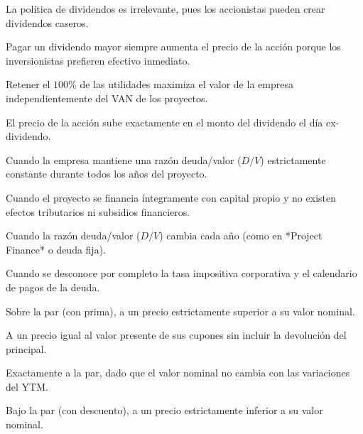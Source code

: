 \begin{opts}
    \item La política de dividendos es irrelevante, pues los accionistas pueden crear dividendos caseros.
    \item Pagar un dividendo mayor siempre aumenta el precio de la acción porque los inversionistas prefieren efectivo inmediato.
    \item Retener el $100\%$ de las utilidades maximiza el valor de la empresa independientemente del VAN de los proyectos.
    \item El precio de la acción sube exactamente en el monto del dividendo el día ex-dividendo.
\end{opts}

\begin{opts}
    \item Cuando la empresa mantiene una razón deuda/valor ($D/V$) estrictamente constante durante todos los años del proyecto.
    \item Cuando el proyecto se financia íntegramente con capital propio y no existen efectos tributarios ni subsidios financieros.
    \item Cuando la razón deuda/valor ($D/V$) cambia cada año (como en *Project Finance* o deuda fija).
    \item Cuando se desconoce por completo la tasa impositiva corporativa y el calendario de pagos de la deuda.
\end{opts}

\begin{opts}
    \item Sobre la par (con prima), a un precio estrictamente superior a su valor nominal.
    \item A un precio igual al valor presente de sus cupones sin incluir la devolución del principal.
    \item Exactamente a la par, dado que el valor nominal no cambia con las variaciones del YTM.
    \item Bajo la par (con descuento), a un precio estrictamente inferior a su valor nominal.
\end{opts}

